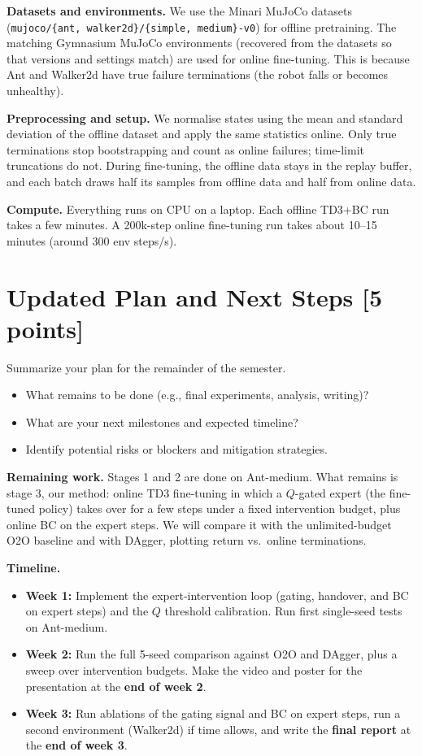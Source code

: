 \documentclass[11pt, letterpaper]{cmu}
\begin{document}
\textbf{Datasets and environments.}
We use the Minari MuJoCo datasets (\texttt{mujoco/\{ant, walker2d\}/\{simple, medium\}-v0})
for offline pretraining. The matching Gymnasium MuJoCo environments (recovered from the datasets so that versions
and settings match) are used for online fine-tuning. This is because Ant and Walker2d have true
failure terminations (the robot falls or becomes unhealthy).

\textbf{Preprocessing and setup.}
We normalise states using the mean and standard deviation of the offline dataset and apply the same
statistics online. Only true terminations stop bootstrapping and count as online failures; time-limit
truncations do not. During fine-tuning, the offline data stays in the replay buffer, and each batch draws
half its samples from offline data and half from online data.

\textbf{Compute.}
Everything runs on CPU on a laptop. Each offline TD3+BC run takes a few
minutes. A 200k-step online fine-tuning run takes about 10--15 minutes (around 300 env steps/s).

\section{Updated Plan and Next Steps [5 points]}
Summarize your plan for the remainder of the semester.
\begin{itemize}
    \item What remains to be done (e.g., final experiments, analysis, writing)?
    \item What are your next milestones and expected timeline?
    \item Identify potential risks or blockers and mitigation strategies.
\end{itemize}

\textbf{Remaining work.}
Stages 1 and 2 are done on Ant-medium. What remains is stage 3, our method: online TD3 fine-tuning
in which a $Q$-gated expert (the fine-tuned policy) takes over for a few steps under a fixed
intervention budget, plus online BC on the expert steps. We will compare it with the unlimited-budget
O2O baseline and with DAgger, plotting return vs.\ online terminations.

\textbf{Timeline.}
\begin{itemize}[itemsep=0pt]
    \item \textbf{Week 1:} Implement the expert-intervention loop (gating, handover, and BC on expert
    steps) and the $Q$ threshold calibration. Run first single-seed tests on Ant-medium.
    \item \textbf{Week 2:} Run the full 5-seed comparison against O2O and DAgger, plus a sweep over intervention
    budgets. Make the video and poster for the presentation at the \textbf{end of week 2}.
    \item \textbf{Week 3:} Run ablations of the gating signal and BC on expert steps, run a second environment
    (Walker2d) if time allows, and write the \textbf{final report} at the \textbf{end of week 3}.
\end{itemize}
\end{document}
